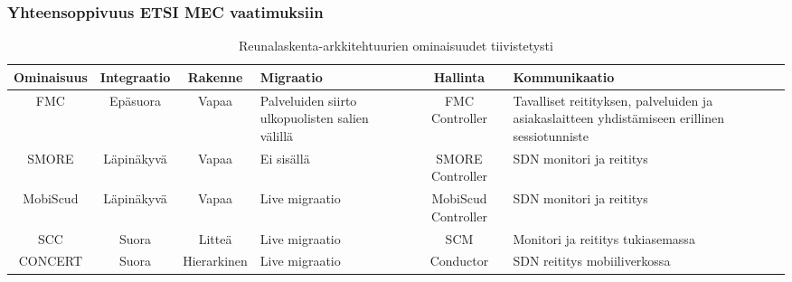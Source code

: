\subsubsection*{Yhteensoppivuus ETSI MEC vaatimuksiin}
%
%
%
%
%
%

\begin{landscape}
    \noindent
\begin{table}[!ht]
\caption{Reunalaskenta-arkkitehtuurien ominaisuudet tiivistetysti}
\label{table:features}
\begin{tabularx}{\linewidth}{|c|c|c|p{3cm}|c|p{5cm}|}
\hline 
 \textbf{Ominaisuus} & \textbf{Integraatio} & \textbf{Rakenne} & \textbf{Migraatio} & \textbf{Hallinta} & \textbf{Kommunikaatio} \\ 
\hline 
 FMC & Epäsuora & Vapaa & Palveluiden siirto ulkopuolisten salien välillä
  & FMC Controller & Tavalliset reitityksen, palveluiden ja asiakaslaitteen yhdistämiseen erillinen sessiotunniste \\ 
\hline 
 SMORE & Läpinäkyvä & Vapaa & Ei sisällä & SMORE Controller & SDN monitori ja reititys \\ 
\hline 
MobiScud & Läpinäkyvä & Vapaa & Live migraatio & MobiScud Controller & SDN monitori ja reititys\\ 
\hline 
SCC & Suora & Litteä & Live migraatio & SCM & Monitori ja reititys tukiasemassa \\ 
\hline 
CONCERT & Suora & Hierarkinen & Live migraatio & Conductor & SDN reititys mobiiliverkossa \\ 
\hline 
\end{tabularx} 
\end{table}
\end{landscape}